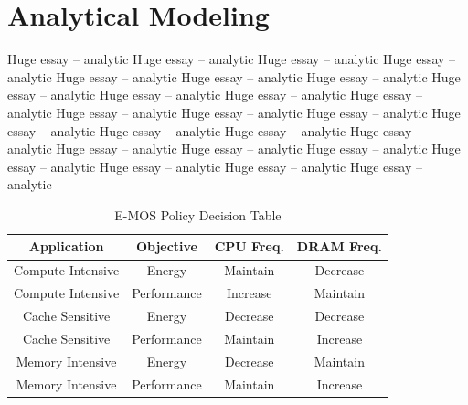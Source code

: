\section{Analytical Modeling}\label{sec:analytic}


Huge essay -- analytic
Huge essay -- analytic
Huge essay -- analytic
Huge essay -- analytic
Huge essay -- analytic
Huge essay -- analytic
Huge essay -- analytic
Huge essay -- analytic
Huge essay -- analytic
Huge essay -- analytic
Huge essay -- analytic
Huge essay -- analytic
Huge essay -- analytic
Huge essay -- analytic
Huge essay -- analytic
Huge essay -- analytic
Huge essay -- analytic
Huge essay -- analytic
Huge essay -- analytic
Huge essay -- analytic
Huge essay -- analytic
Huge essay -- analytic
Huge essay -- analytic
Huge essay -- analytic
Huge essay -- analytic

\begin{table}[h]
\footnotesize
\def\arraystretch{0.52}
\setlength{\tabcolsep}{.30em}
\center
\begin{tabular}{cccc} \toprule
Application & Objective & CPU Freq. & DRAM Freq.  \\ \midrule
Compute Intensive & Energy & Maintain & Decrease \\
Compute Intensive & Performance & Increase & Maintain \\
Cache Sensitive & Energy &  Decrease & Decrease \\ 
Cache Sensitive & Performance &  Maintain & Increase \\ 
Memory Intensive & Energy & Decrease & Maintain \\
Memory Intensive & Performance & Maintain & Increase \\ \midrule

\end{tabular}
\caption{E-MOS Policy Decision Table}\label{tbl:emos-dec}
\end{table}


